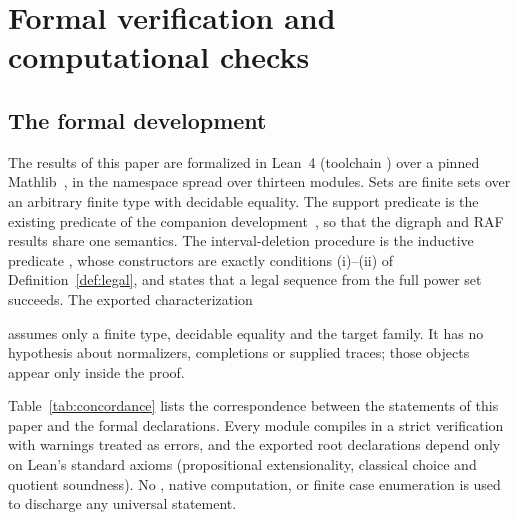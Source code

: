 \documentclass[11pt,a4paper]{article}
\theoremstyle{plain}
\theoremstyle{definition}
\theoremstyle{remark}
\begin{document}
\section{Formal verification and computational checks}\label{sec:verification}

\subsection{The formal development}

The results of this paper are formalized in Lean~4 (toolchain ) over a pinned Mathlib~\cite{demoura2021lean4,mathlib2020}, in the namespace  spread over thirteen modules. Sets are finite sets over an arbitrary finite type with decidable equality. The support predicate is the existing predicate  of the companion development~\cite{companion2026antimatroid}, so that the digraph and RAF results share one semantics. The interval-deletion procedure is the inductive predicate , whose constructors are exactly conditions (i)--(ii) of Definition~\ref{def:legal}, and  states that a legal sequence from the full power set succeeds. The exported characterization
\begin{center}
\end{center}
assumes only a finite type, decidable equality and the target family. It has no hypothesis about normalizers, completions or supplied traces; those objects appear only inside the proof.

Table~\ref{tab:concordance} lists the correspondence between the statements of this paper and the formal declarations. Every module compiles in a strict verification with warnings treated as errors, and the exported root declarations depend only on Lean's standard axioms (propositional extensionality, classical choice and quotient soundness). No , native computation, or finite case enumeration is used to discharge any universal statement.
\end{document}
